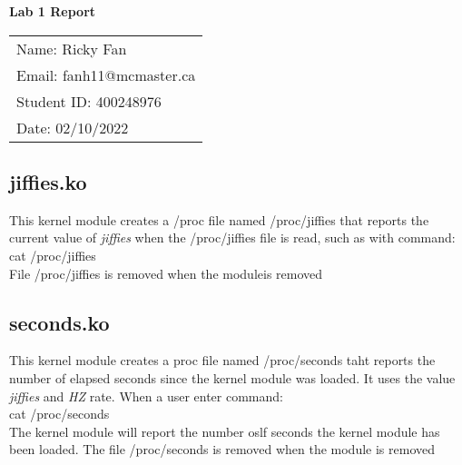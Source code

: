 \documentclass[11pt,fleqn]{article}
\begin{document}
\begin{center}
	{\Large \textbf{Lab 1 Report}}\\[6mm]
	\begin{tabular}{l}
        {\large Name: Ricky Fan}       \\
		{\large Email: fanh11@mcmaster.ca} \\
		{\large Student ID: 400248976}    \\
		{\large Date: 02/10/2022}
	\end{tabular}

\end{center}

\medskip

\subsection*{jiffies.ko}
This kernel module creates a /proc file named /proc/jiffies 
that reports the current value of \emph{jiffies} when the /proc/jiffies 
file is read, such as with command: \\

cat /proc/jiffies \\

\noindent 
File /proc/jiffies is removed when the moduleis removed



\medskip

\subsection*{seconds.ko}
This kernel module creates a proc file named /proc/seconds 
taht reports the number of elapsed seconds since the kernel 
module was loaded. It uses the value \emph{jiffies} and \emph{HZ} 
rate. When a user enter command: \\

cat /proc/seconds \\

\noindent 
The kernel module will report the number oslf seconds the kernel 
module has been loaded. The file /proc/seconds is removed 
when the module is removed

\end{document}

